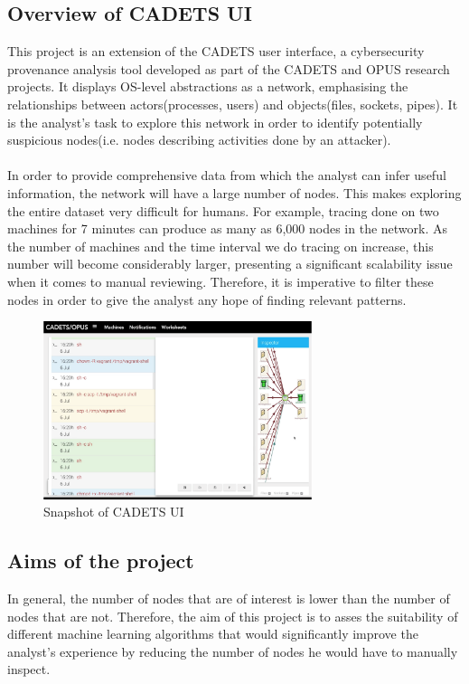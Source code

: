 	\subsection{Overview of CADETS UI}\label{1.1.1}
	This project is an extension of the CADETS user interface, a cybersecurity provenance analysis tool developed as part of the CADETS and OPUS research projects. It displays OS-level abstractions as a network, emphasising the relationships between actors(processes, users) and objects(files, sockets, pipes). It is the analyst's task to explore this network in order to identify potentially suspicious nodes(i.e. nodes describing activities done by an attacker). 
	\\ \\
	In order to provide comprehensive data from which the analyst can infer useful information, the network will have a large number of nodes. This makes exploring the entire dataset very difficult for humans.  For example, tracing done on two machines for 7 minutes can produce as many as 6,000 nodes in the network. As the number of machines and the time interval we do tracing on increase, this number will become considerably larger, presenting a significant scalability issue when it comes to manual reviewing. Therefore, it is imperative to filter these nodes in order to give the analyst any hope of finding relevant patterns.
	\begin{figure}[H]
		\centering
		\includegraphics[width=0.7\textwidth]{graphics/CADETS}
		\caption{Snapshot of CADETS UI}
		\label{Figure 1.1}
	\end{figure}
	
	\subsection{Aims of the project}
	In general, the number of nodes that are of interest is lower than the number of nodes that are not. Therefore, the aim of this project is to asses the suitability of different machine learning algorithms that would significantly improve the analyst's experience by reducing the number of nodes he would have to manually inspect. 
	
